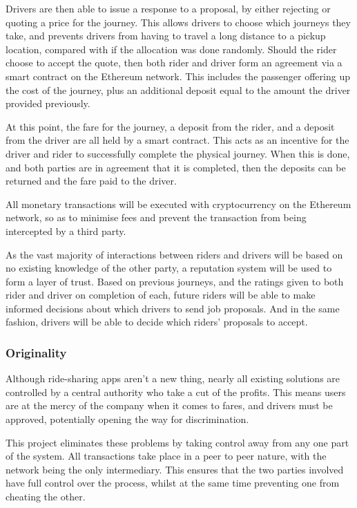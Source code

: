 Drivers are then able to issue a response to a proposal, by either rejecting or quoting a price for the journey. This allows drivers to choose which journeys they take, and prevents drivers from having to travel a long distance to a pickup location, compared with if the allocation was done randomly. Should the rider choose to accept the quote, then both rider and driver form an agreement via a smart contract on the Ethereum network. This includes the passenger offering up the cost of the journey, plus an additional deposit equal to the amount the driver provided previously.

At this point, the fare for the journey, a deposit from the rider, and a deposit from the driver are all held by a smart contract. This acts as an incentive for the driver and rider to successfully complete the physical journey. When this is done, and both parties are in agreement that it is completed, then the deposits can be returned and the fare paid to the driver.

All monetary transactions will be executed with cryptocurrency on the Ethereum network, so as to minimise fees and prevent the transaction from being intercepted by a third party.

As the vast majority of interactions between riders and drivers will be based on no existing knowledge of the other party, a reputation system will be used to form a layer of trust. Based on previous journeys, and the ratings given to both rider and driver on completion of each, future riders will be able to make informed decisions about which drivers to send job proposals. And in the same fashion, drivers will be able to decide which riders’ proposals to accept.

\subsubsection*{Originality}

Although ride-sharing apps aren’t a new thing, nearly all existing solutions are controlled by a central authority who take a cut of the profits. This means users are at the mercy of the company when it comes to fares, and drivers must be approved, potentially opening the way for discrimination.

This project eliminates these problems by taking control away from any one part of the system. All transactions take place in a peer to peer nature, with the network being the only intermediary. This ensures that the two parties involved have full control over the process, whilst at the same time preventing one from cheating the other.

